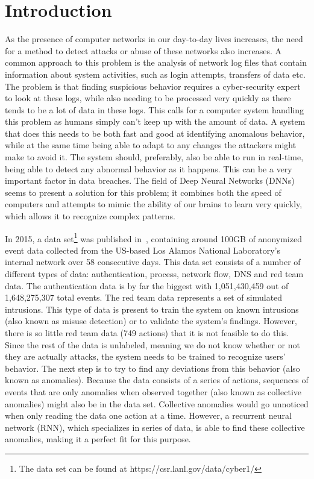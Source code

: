 \chapter{Introduction}\label{ch:introduction}
As the presence of computer networks in our day-to-day lives increases, the need for a method to detect attacks or abuse of these networks also increases. A common approach to this problem is the analysis of network log files that contain information about system activities, such as login attempts, transfers of data etc. The problem is that finding suspicious behavior requires a cyber-security expert to look at these logs, while also needing to be processed very quickly as there tends to be a lot of data in these logs. This calls for a computer system handling this problem as humans simply can't keep up with the amount of data. A system that does this needs to be both fast and good at identifying anomalous behavior, while at the same time being able to adapt to any changes the attackers might make to avoid it. The system should, preferably, also be able to run in real-time, being able to detect any abnormal behavior as it happens. This can be a very important factor in data breaches. The field of Deep Neural Networks (DNNs) seems to present a solution for this problem; it combines both the speed of computers and attempts to mimic the ability of our brains to learn very quickly, which allows it to recognize complex patterns.

In 2015, a data set\footnote{The data set can be found at https://csr.lanl.gov/data/cyber1/} was published in~\cite{akent-2015-enterprise-data}, containing around 100GB of anonymized event data collected from the US-based Los Alamos National Laboratory's internal network over 58 consecutive days. This data set consists of a number of different types of data: authentication, process, network flow, DNS and red team data. The authentication data is by far the biggest with 1,051,430,459 out of 1,648,275,307 total events. The red team data represents a set of simulated intrusions. This type of data is present to train the system on known intrusions (also known as misuse detection) or to validate the system's findings. However, there is so little red team data (749 actions) that it is not feasible to do this. Since the rest of the data is unlabeled, meaning we do not know whether or not they are actually attacks, the system needs to be trained to recognize users' behavior. The next step is to try to find any deviations from this behavior (also known as anomalies). Because the data consists of a series of actions, sequences of events that are only anomalies when observed together (also known as collective anomalies) might also be in the data set. Collective anomalies would go unnoticed when only reading the data one action at a time. However, a recurrent neural network (RNN), which specializes in series of data, is able to find these collective anomalies, making it a perfect fit for this purpose.

